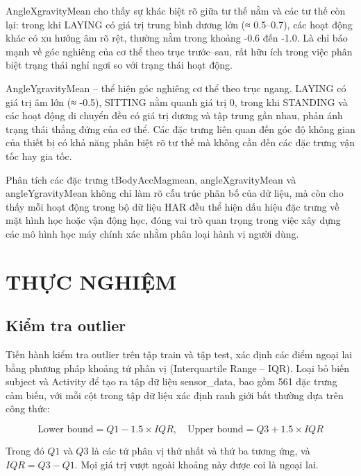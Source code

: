 \documentclass[
]{article}
\begin{document}
AngleXgravityMean cho thấy sự khác biệt rõ giữa tư thế nằm và các tư thế
còn lại: trong khi LAYING có giá trị trung bình dương lớn (≈ 0.5--0.7),
các hoạt động khác có xu hướng âm rõ rệt, thường nằm trong khoảng -0.6
đến -1.0. Là chỉ báo mạnh về góc nghiêng của cơ thể theo trục
trước--sau, rất hữu ích trong việc phân biệt trạng thái nghỉ ngơi so với
trạng thái hoạt động.

AngleYgravityMean -- thể hiện góc nghiêng cơ thể theo trục ngang. LAYING
có giá trị âm lớn (≈ -0.5), SITTING nằm quanh giá trị 0, trong khi
STANDING và các hoạt động di chuyển đều có giá trị dương và tập trung
gần nhau, phản ánh trạng thái thẳng đứng của cơ thể. Các đặc trưng liên
quan đến góc độ không gian của thiết bị có khả năng phân biệt rõ tư thế
mà không cần đến các đặc trưng vận tốc hay gia tốc.

Phân tích các đặc trưng tBodyAccMagmean, angleXgravityMean và
angleYgravityMean không chỉ làm rõ cấu trúc phân bố của dữ liệu, mà còn
cho thấy mỗi hoạt động trong bộ dữ liệu HAR đều thể hiện dấu hiệu đặc
trưng về mặt hình học hoặc vận động học, đóng vai trò quan trọng trong
việc xây dựng các mô hình học máy chính xác nhằm phân loại hành vi người
dùng.

\newpage

\section{THỰC NGHIỆM}\label{thux1ef1c-nghiux1ec7m}

\subsection{Kiểm tra outlier}\label{kiux1ec3m-tra-outlier}

Tiến hành kiểm tra outlier trên tập train và tập test, xác định các điểm
ngoại lai bằng phương pháp khoảng tứ phân vị (Interquartile Range --
IQR). Loại bỏ biến subject và Activity để tạo ra tập dữ liệu
sensor\_data, bao gồm 561 đặc trưng cảm biến, với mỗi cột trong tập dữ
liệu xác định ranh giới bất thường dựa trên công thức:

\[
\text{Lower bound} = Q1 - 1.5 \times IQR, \quad
\text{Upper bound} = Q3 + 1.5 \times IQR
\]

Trong đó \emph{\(Q1\)} và \emph{\(Q3\)} là các tứ phân vị thứ nhất và
thứ ba tương ứng, và \emph{\(IQR = Q3 - Q1\)}. Mọi giá trị vượt ngoài
khoảng này được coi là ngoại lai.
\end{document}
